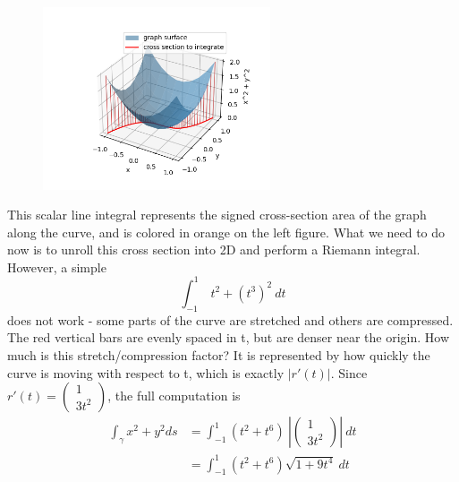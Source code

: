 \documentclass[11pt,openany]{book}
\begin{document}
	\begin{figure} 
		\centering
		\includegraphics[width=0.6\textwidth]{sin.png}
	\end{figure}
	This scalar line integral represents the signed cross-section area of the graph along the curve, and is colored in orange on the left figure.
	What we need to do now is to unroll this cross section into 2D and perform a Riemann integral. However, a simple 
	\[
		\int_{-1}^{1} \ t^2 + (t^3)^2 \ dt
	\]
	does not work - some parts of the curve are stretched and others are compressed. The red vertical bars are evenly spaced in t, but are denser near the origin. How much is this stretch/compression factor? 
	It is represented by how quickly the curve is moving with respect to t, which is exactly $|r'(t)|$.
	Since $r'(t) = \begin{pmatrix}
		1 \\ 3t^2
	\end{pmatrix}$, the full computation is
	\begin{align*}
		\int_\gamma x^2+y^2 ds &= \int_{-1}^1 (t^2+t^6)  \ |\begin{pmatrix}
			1 \\ 3t^2
		\end{pmatrix}| \ dt \\
		&= \int_{-1}^{1} (t^2+t^6) \sqrt{1+9t^4} \ dt
		\\
	\end{align*}
\end{document}
